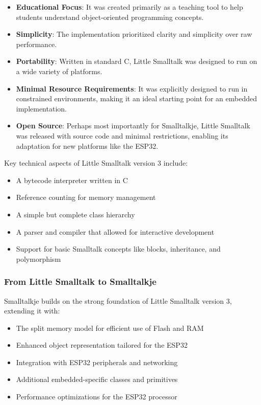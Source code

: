 \documentclass[12pt,a4paper]{report}
\begin{document}
\begin{itemize}
    \item \textbf{Educational Focus}: It was created primarily as a teaching tool to help students understand object-oriented programming concepts.
    
    \item \textbf{Simplicity}: The implementation prioritized clarity and simplicity over raw performance.
    
    \item \textbf{Portability}: Written in standard C, Little Smalltalk was designed to run on a wide variety of platforms.
    
    \item \textbf{Minimal Resource Requirements}: It was explicitly designed to run in constrained environments, making it an ideal starting point for an embedded implementation.
    
    \item \textbf{Open Source}: Perhaps most importantly for Smalltalkje, Little Smalltalk was released with source code and minimal restrictions, enabling its adaptation for new platforms like the ESP32.
\end{itemize}

Key technical aspects of Little Smalltalk version 3 include:

\begin{itemize}
    \item A bytecode interpreter written in C
    \item Reference counting for memory management
    \item A simple but complete class hierarchy
    \item A parser and compiler that allowed for interactive development
    \item Support for basic Smalltalk concepts like blocks, inheritance, and polymorphism
\end{itemize}

\subsubsection{From Little Smalltalk to Smalltalkje}

Smalltalkje builds on the strong foundation of Little Smalltalk version 3, extending it with:

\begin{itemize}
    \item The split memory model for efficient use of Flash and RAM
    \item Enhanced object representation tailored for the ESP32
    \item Integration with ESP32 peripherals and networking
    \item Additional embedded-specific classes and primitives
    \item Performance optimizations for the ESP32 processor
\end{itemize}
\end{document}
